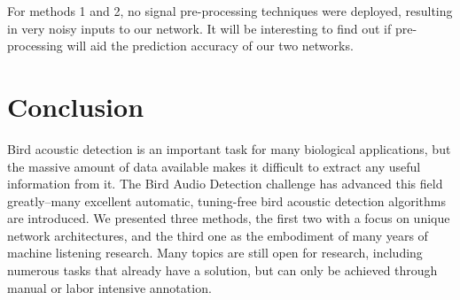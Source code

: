 \documentclass[10pt,twocolumn,letterpaper]{article}
\begin{document}
For methods 1 and 2, no signal pre-processing techniques were deployed,
resulting in very noisy inputs to our network. It will be interesting to
find out if pre-processing will aid the prediction accuracy of our two
networks.

\section{Conclusion}

Bird acoustic detection is an important task for many biological
applications, but the massive amount of data available makes it difficult
to extract any useful information from it. The Bird Audio Detection
challenge has advanced this field greatly--many excellent automatic,
tuning-free bird acoustic detection algorithms are introduced.  We
presented three methods, the first two with a focus on unique network
architectures, and the third one as the embodiment of many years of machine
listening research.  Many topics are still open for research, including
numerous tasks that already have a solution, but can only be achieved
through manual or labor intensive annotation.


{\small   }
\end{document}
